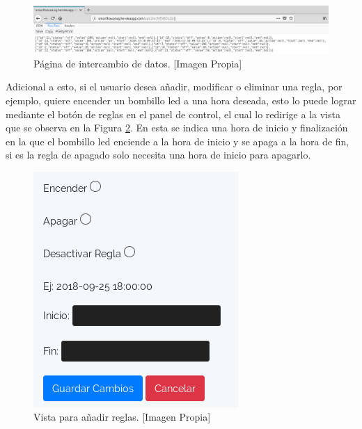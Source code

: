 \begin{figure}[H]
	\centering
	\caption[Página de intercambio de datos.]{Página de intercambio de datos. [Imagen Propia]}
	\label{fig:updateview}
	\includegraphics[width=\linewidth]{Imagenes/Update_view}
\end{figure}

Adicional a esto, si el usuario desea añadir, modificar o eliminar una regla, por ejemplo, quiere encender un bombillo led a una hora deseada, esto lo puede lograr mediante el botón de reglas en el panel de control, el cual lo redirige a la vista que se observa en la Figura \ref{fig:rulesview}. En esta se indica una hora de inicio y finalización en la que el bombillo led enciende a la hora de inicio y se apaga a la hora de fin, si es la regla de apagado solo necesita una hora de inicio para apagarlo.\\

\begin{figure}[H]
	\centering
	\caption[Vista para añadir reglas.]{Vista para añadir reglas. [Imagen Propia]}
	\label{fig:rulesview}
	\includegraphics[width=0.25\linewidth]{Imagenes/rules_view}
\end{figure}


